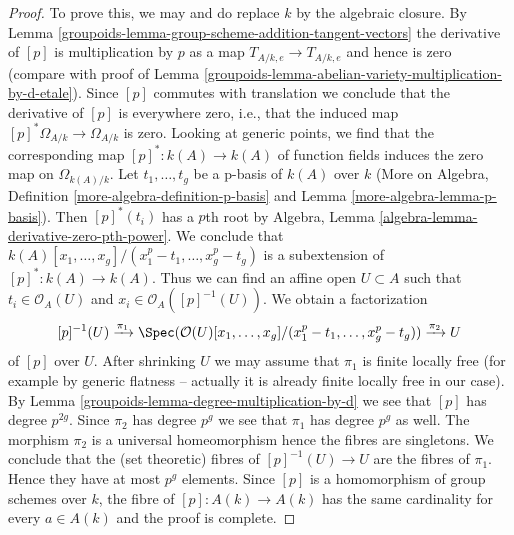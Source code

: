\begin{proof}

To prove this, we may and do replace $k$ by the algebraic closure.
By Lemma \ref{groupoids-lemma-group-scheme-addition-tangent-vectors}
the derivative of $[p]$ is multiplication by $p$ as a map
$T_{A/k, e} \to T_{A/k, e}$ and hence is zero (compare
with proof of Lemma \ref{groupoids-lemma-abelian-variety-multiplication-by-d-etale}).
Since $[p]$ commutes with translation we conclude that the derivative of $[p]$
is everywhere zero, i.e., that the induced map
$[p]^*\Omega_{A/k} \to \Omega_{A/k}$ is zero.
Looking at generic points, we find that
the corresponding map $[p]^* : k(A) \to k(A)$
of function fields induces the zero map on $\Omega_{k(A)/k}$.
Let $t_1, \ldots, t_g$ be a p-basis of $k(A)$ over $k$
(More on Algebra, Definition \ref{more-algebra-definition-p-basis} and
Lemma \ref{more-algebra-lemma-p-basis}). Then $[p]^*(t_i)$
has a $p$th root by
Algebra, Lemma \ref{algebra-lemma-derivative-zero-pth-power}.
We conclude that
$k(A)[x_1, \ldots, x_g]/(x_1^p - t_1, \ldots, x_g^p - t_g)$ is a subextension
of $[p]^* : k(A) \to k(A)$.
Thus we can find an affine open $U \subset A$ such that
$t_i \in \mathcal{O}_A(U)$ and $x_i \in \mathcal{O}_A([p]^{-1}(U))$.
We obtain a factorization
$$
[p]^{-1}(U)
\xrightarrow{\pi_1}
\Spec(\mathcal{O}(U)[x_1, \ldots, x_g]/(x_1^p - t_1, \ldots, x_g^p - t_g))
\xrightarrow{\pi_2}
U
$$
of $[p]$ over $U$. After shrinking $U$ we may assume that $\pi_1$
is finite locally free (for example by generic flatness -- actually it is
already finite locally free in our case).
By Lemma \ref{groupoids-lemma-degree-multiplication-by-d} we see that
$[p]$ has degree $p^{2g}$. Since $\pi_2$
has degree $p^g$ we see that $\pi_1$ has degree $p^g$ as well.
The morphism $\pi_2$ is a universal homeomorphism hence the fibres are
singletons. We conclude that the (set theoretic) fibres of $[p]^{-1}(U) \to U$
are the fibres of $\pi_1$. Hence they
have at most $p^g$ elements. Since $[p]$ is a homomorphism of group
schemes over $k$, the fibre of $[p] : A(k) \to A(k)$ has the
same cardinality for every $a \in A(k)$ and the proof is complete.
\end{proof}

